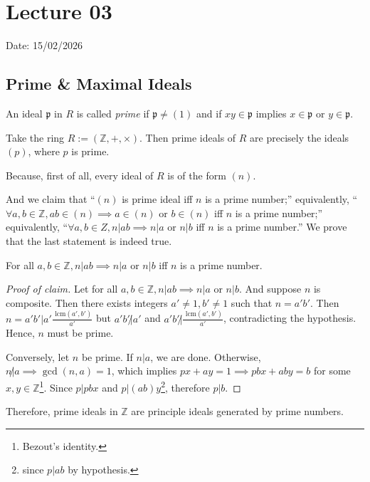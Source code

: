 \chapter{Lecture 03}
\hfill {\footnotesize Date: 15/02/2026}
\section{Prime \& Maximal Ideals}
\begin{definition}
    An ideal \(\mathfrak{p}\) in \(R\) is called \emph{prime} if \(\mathfrak{p} \neq (1)\) and if \(xy \in \mathfrak{p}\) implies \(x \in \mathfrak{p}\)  or \(y \in \mathfrak{p}\).   
\end{definition}
\begin{example}
    Take the ring \(R := (\mathbb{Z}, +, \times)\). Then prime ideals of \(R\) are precisely the ideals \((p)\), where \(p\) is prime.

    Because, first of all, every ideal of \(R\) is of the form \((n)\). 

    And we claim that ``\((n)\) is prime ideal iff \(n\) is a prime number;'' 
    equivalently, ``\(\forall a, b \in \mathbb{Z}, ab \in (n) \implies a \in (n) \text{ or } b \in (n)\) iff \(n\) is a prime number;''
 equivalently, ``\(\forall a, b \in Z, n \vert ab \implies n \vert a \text{ or } n \vert b\) iff \(n\) is a prime number.'' We prove that the last statement is indeed true.
    \begin{claim}
        For all \(a, b \in \mathbb{Z}, n \vert ab \implies n \vert a \text{ or } n \vert b\) iff \(n\) is a prime number. 
    \end{claim}
    \begin{proof}[Proof of claim]
        Let for all \(a, b \in \mathbb{Z}, n | ab \implies n | a \text{ or } n | b\). And suppose \(n\) is composite. Then there exists integers \(a'\neq 1, b' \neq 1\) such that \(n = a'b'\). Then \(n = a'b' \big| a' \frac{\text{ lcm}(a', b')}{a'}\) but \(a'b' \not| a'\) and \(a'b' \not| \frac{\text{ lcm}(a', b')}{a'}\), contradicting the hypothesis. Hence, \(n\) must be prime.

        Conversely, let \(n\) be prime. If \(n | a\), we are done. Otherwise, \(n \not| a \implies \operatorname{gcd}(n,a) = 1\), which implies \(px + ay = 1 \implies pbx + aby = b\) for some \(x, y \in \mathbb{Z}\)\footnote{Bezout's identity.}. Since \(p | pbx\) and \(p | (ab)y\)\footnote{since \(p | ab\) by hypothesis.}, therefore \(p | b\).
    \end{proof}
    Therefore, prime ideals in \(\mathbb{Z}\) are principle ideals generated by prime numbers.
\end{example}
